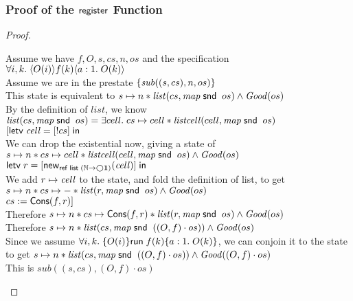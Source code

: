 \subsubsection{Proof of the $\mathsf{register}$ Function}
\begin{proof}
\begin{tabbedproof}
\oo Assume we have $f, O, s, cs, n, os$ and the specification $\forall i,k.\;\langle{O(i)}\rangle{{f(k)}}\langle{a:1}.\;{O(k)}\rangle$ \\
\ooo Assume we are in the prestate $\{{\mathit{sub}((s,cs), n, os)}\}$ \\
\ooo This state is equivalent to $s \mapsto n * \mathit{list}(cs, \mathit{map}\;\mathsf{snd}\;\;os) \land \mathit{Good}(os)$ \\
\ooo By the definition of $\mathit{list}$, we know \\
\ooox $\mathit{list}(cs, \mathit{map}\;\mathsf{snd}\;\;os) = \exists cell.\;cs \mapsto cell * \mathit{listcell}(cell, \mathit{map}\;\mathsf{snd}\;\;os)$ \\
\ooo $[\mathsf{letv}\;\mathit{cell} = [!cs]\;\mathsf{in}\;$ \\
\ooo We can drop the existential now, giving a state of \\
\ooox $s \mapsto n * cs \mapsto cell * \mathit{listcell}(cell, \mathit{map}\;\mathsf{snd}\;\;os) \land \mathit{Good}(os)$ \\
\ooo $\mathsf{letv}\;r = [\mathsf{new}_{\mathsf{ref}\;\mathsf{list}\;{(\mathbb{N} \to \bigcirc{\mathbf{1}})}}(\mathit{cell})]\;\mathsf{in}\;$ \\
\ooo We add $r \mapsto \mathit{cell}$ to the state, and fold the definition of list, to get \\
\ooox $s \mapsto n * cs \mapsto - * \mathit{list}(r, \mathit{map}\;\mathsf{snd}\;\;os) \land \mathit{Good}(os)$ \\ 
\ooo $cs := \mathsf{Cons}(f, r)]$ \\
\ooo Therefore $s \mapsto n * cs \mapsto \mathsf{Cons}(f,r) * \mathit{list}(r, \mathit{map}\;\mathsf{snd}\;\;os) \land \mathit{Good}(os)$ \\ 
\ooo Therefore $s \mapsto n * \mathit{list}(cs, \mathit{map}\;\mathsf{snd}\;\;((O,f) \cdot os)) \land \mathit{Good}(os)$ \\ 
\ooo Since we assume $\forall i,k.\;\{{O(i)}\}{\mathsf{run}\;{f(k)}}\{{a:1}.\;{O(k)}\}$, we can conjoin it to the state \\
\ooox to get $s \mapsto n * \mathit{list}(cs, \mathit{map}\;\mathsf{snd}\;\;((O,f) \cdot os)) \land \mathit{Good}((O,f) \cdot os)$ \\ 
\ooo This is $\mathit{sub}((s,cs), (O,f)\cdot os)$
\end{tabbedproof}
\end{proof}

